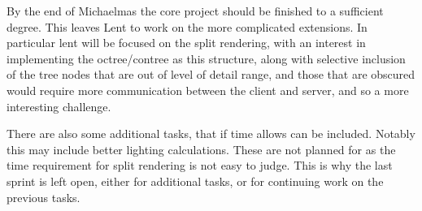 By the end of Michaelmas the core project should be finished to a
sufficient degree. This leaves Lent to work on the more complicated extensions.
In particular lent will be focused on the split rendering, with an interest in
implementing the octree/contree as this structure, along with
selective inclusion
of the tree nodes that are out of level of detail range, and those that are
obscured would require more communication between the client and server, and so
a more interesting challenge.

There are also some additional tasks, that if time allows can be included.
Notably this may include better lighting calculations. These are not
planned for as the time requirement for
split rendering is not easy to judge. This is why the last sprint is left open,
either for additional tasks, or for continuing work on the previous tasks.
